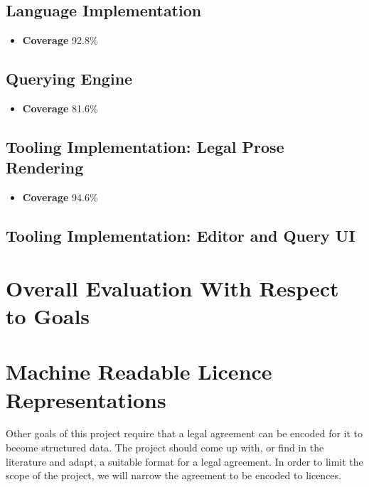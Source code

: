 \subsection{Language Implementation}

\begin{itemize}
    \item \textbf{Coverage} 92.8\%
\end{itemize}

\subsection{Querying Engine}

\begin{itemize}
    \item \textbf{Coverage} 81.6\%
\end{itemize}

\subsection{Tooling Implementation: Legal Prose Rendering}

\begin{itemize}
    \item \textbf{Coverage} 94.6\%
\end{itemize}

\subsection{Tooling Implementation: Editor and Query UI}


\section[Overall Evaluation]{Overall Evaluation With Respect to Goals}


\section{Machine Readable Licence Representations}\label{sec:licence-representations}



Other goals of this project require that a legal agreement can be encoded for it to become
structured data.
The project should come up with, or find in the literature and adapt, a suitable format for a legal
agreement.
In order to limit the scope of the project, we will narrow the agreement to be encoded to
licences.


